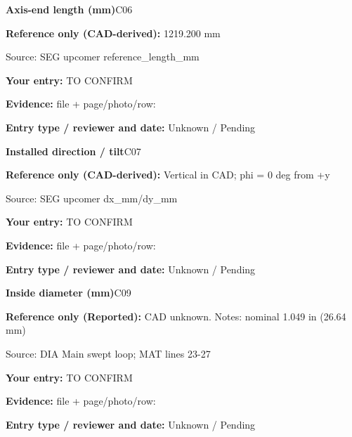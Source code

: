 \documentclass[11pt]{article}
\begin{document}
\begin{minipage}{\textwidth}\small
{\color{navy}\bfseries Axis-end length (mm)}\hfill C06\par
\colorbox{pale}{\parbox{\dimexpr\linewidth-2\fboxsep\relax}{
\textbf{Reference only (CAD-derived):} 1219.200 mm\par
{\footnotesize Source: SEG upcomer reference\_\allowbreak{}length\_\allowbreak{}mm}}}\par
\textbf{Your entry:} {\color{muted}TO CONFIRM}\enspace\hrulefill\par
{\footnotesize\textbf{Evidence:} file + page/photo/row: \hrulefill\par
\textbf{Entry type / reviewer and date:} Unknown / Pending\par
}\end{minipage}\par\vspace{5pt}
\begin{minipage}{\textwidth}\small
{\color{navy}\bfseries Installed direction / tilt}\hfill C07\par
\colorbox{pale}{\parbox{\dimexpr\linewidth-2\fboxsep\relax}{
\textbf{Reference only (CAD-derived):} Vertical in CAD; phi = 0 deg from +y\par
{\footnotesize Source: SEG upcomer dx\_\allowbreak{}mm/dy\_\allowbreak{}mm}}}\par
\textbf{Your entry:} {\color{muted}TO CONFIRM}\enspace\hrulefill\par
{\footnotesize\textbf{Evidence:} file + page/photo/row: \hrulefill\par
\textbf{Entry type / reviewer and date:} Unknown / Pending\par
}\end{minipage}\par\vspace{5pt}
\begin{minipage}{\textwidth}\small
{\color{navy}\bfseries Inside diameter (mm)}\hfill C09\par
\colorbox{pale}{\parbox{\dimexpr\linewidth-2\fboxsep\relax}{
\textbf{Reference only (Reported):} CAD unknown. Notes: nominal 1.049 in (26.64 mm)\par
{\footnotesize Source: DIA Main swept loop; MAT lines 23-27}}}\par
\textbf{Your entry:} {\color{muted}TO CONFIRM}\enspace\hrulefill\par
{\footnotesize\textbf{Evidence:} file + page/photo/row: \hrulefill\par
\textbf{Entry type / reviewer and date:} Unknown / Pending\par
}\end{minipage}\par\vspace{5pt}
\end{document}
